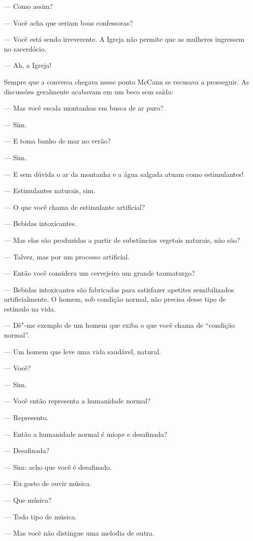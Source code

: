 --- Como assim?

--- Você acha que seriam boas confessoras?

--- Você está sendo irreverente.  A Igreja não permite que as
mulheres ingressem no sacerdócio.

--- Ah, a Igreja!

Sempre que a conversa chegava nesse ponto McCann se recusava a
prosseguir.  As discussões geralmente acabavam em um beco sem saída:

--- Mas você escala montanhas em busca de ar puro?

--- Sim.

--- E toma banho de mar no verão?

--- Sim.

--- E sem dúvida o ar da montanha e a água salgada atuam como
estimulantes!

--- Estimulantes naturais, sim.

--- O que você chama de estimulante artificial?

--- Bebidas intoxicantes.

--- Mas elas são produzidas a partir de substâncias vegetais
naturais, não são?

--- Talvez, mas por um processo artificial.

--- Então você considera um cervejeiro um grande taumaturgo?

--- Bebidas intoxicantes são fabricadas para satisfazer apetites
sensibilizados artificialmente.  O homem, sob condição normal, não
precisa desse tipo de estímulo na vida.

--- Dê"-me exemplo de um homem que exiba o que você chama de
“condição normal”.

--- Um homem que leve uma vida saudável, natural.

--- Você?

--- Sim.

--- Você então representa a humanidade normal?

--- Represento.

--- Então a humanidade normal é míope e desafinada?

--- Desafinada?

--- Sim: acho que você é desafinado.

--- Eu gosto de ouvir música.

--- Que música?

--- Todo tipo de música.

--- Mas você não distingue uma melodia de outra.

